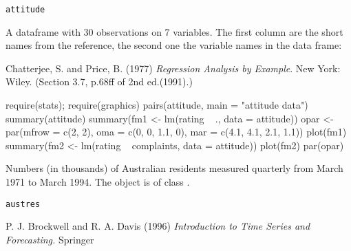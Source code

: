 \begin{Usage}
\begin{verbatim}
attitude
\end{verbatim}
\end{Usage}
%
\begin{Format}
A dataframe with 30 observations on 7 variables. The first column are
the short names from the reference, the second one the variable names
in the data frame:

\end{Format}
%
\begin{Source}\relax
Chatterjee, S. and Price, B. (1977)
\emph{Regression Analysis by Example}.
New York: Wiley.
(Section 3.7, p.68ff of 2nd ed.(1991).)
\end{Source}
%
\begin{Examples}
\begin{ExampleCode}
require(stats); require(graphics)
pairs(attitude, main = "attitude data")
summary(attitude)
summary(fm1 <- lm(rating ~ ., data = attitude))
opar <- par(mfrow = c(2, 2), oma = c(0, 0, 1.1, 0),
            mar = c(4.1, 4.1, 2.1, 1.1))
plot(fm1)
summary(fm2 <- lm(rating ~ complaints, data = attitude))
plot(fm2)
par(opar)
\end{ExampleCode}
\end{Examples}
%
\begin{Description}\relax
Numbers (in thousands) of Australian residents measured quarterly from
March 1971 to March 1994.  The object is of class .
\end{Description}
%
\begin{Usage}
\begin{verbatim}
austres
\end{verbatim}
\end{Usage}
%
\begin{Source}\relax
P. J. Brockwell and R. A. Davis (1996)
\emph{Introduction to Time Series and Forecasting.}
Springer
\end{Source}
